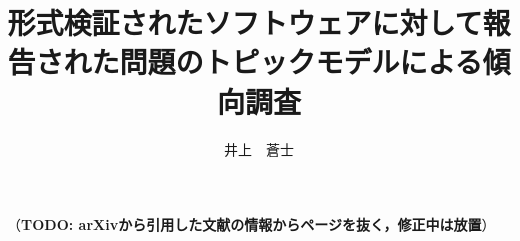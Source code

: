 \documentclass[a4j,12pt,twoside]{jreport}
\author{井上　蒼士}
\title{形式検証されたソフトウェアに対して報告された\coverbreak 問題の\abstbreak トピックモデルによる傾向調査}
\newcommand{\todo}[1]{
	{
		\color{red}
		（\textbf{TODO: #1}）
	}
}
\begin{document}
\maketitle



\begin{contents}
	\tableofcontents
\end{contents}






% 
% 




\todo{arXivから引用した文献の情報からページを抜く，修正中は放置}

% 
\end{document}
